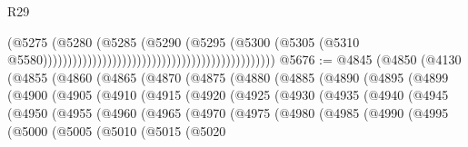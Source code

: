 \begin{lexlean}{R29}
\begin{coremodule}
                                                                                  (@5275
                                                                                    (@5280
                                                                                      (@5285
                                                                                        (@5290
                                                                                          (@5295
                                                                                            (@5300
                                                                                              (@5305
                                                                                                (@5310
                                                                                                  @5580)))))))))))))))))))))))))))))))))))))))))))))))
@5676 := @4845
    (@4850
      (@4130
        (@4855
          (@4860
            (@4865
              (@4870
                (@4875
                  (@4880
                    (@4885
                      (@4890
                        (@4895
                          (@4899
                            (@4900
                              (@4905
                                (@4910
                                  (@4915
                                    (@4920
                                      (@4925
                                        (@4930
                                          (@4935
                                            (@4940
                                              (@4945
                                                (@4950
                                                  (@4955
                                                    (@4960
                                                      (@4965
                                                        (@4970
                                                          (@4975
                                                            (@4980
                                                              (@4985
                                                                (@4990
                                                                  (@4995
                                                                    (@5000
                                                                      (@5005
                                                                        (@5010
                                                                          (@5015
                                                                            (@5020

\end{coremodule}
\end{lexlean}
